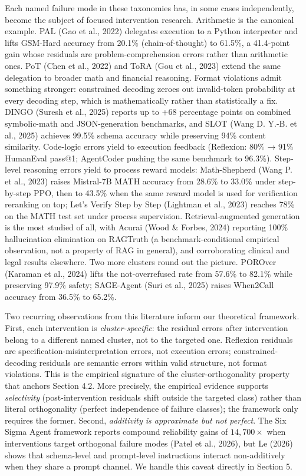 \documentclass[
]{article}
\begin{document}
Each named failure mode in these taxonomies has, in some cases
independently, become the subject of focused intervention research.
Arithmetic is the canonical example. PAL (Gao et al., 2022) delegates
execution to a Python interpreter and lifts GSM-Hard accuracy from
20.1\% (chain-of-thought) to 61.5\%, a 41.4-point gain whose residuals
are problem-comprehension errors rather than arithmetic ones. PoT (Chen
et al., 2022) and ToRA (Gou et al., 2023) extend the same delegation to
broader math and financial reasoning. Format violations admit something
stronger: constrained decoding zeroes out invalid-token probability at
every decoding step, which is mathematically rather than statistically a
fix. DINGO (Suresh et al., 2025) reports up to +68 percentage points on
combined symbolic-math and JSON-generation benchmarks, and SLOT (Wang D.
Y.-B. et al., 2025) achieves 99.5\% schema accuracy while preserving
94\% content similarity. Code-logic errors yield to execution feedback
(Reflexion: 80\% → 91\% HumanEval pass@1; AgentCoder pushing the same
benchmark to 96.3\%). Step-level reasoning errors yield to process
reward models: Math-Shepherd (Wang P. et al., 2023) raises Mistral-7B
MATH accuracy from 28.6\% to 33.0\% under step-by-step PPO, then to
43.5\% when the same reward model is used for verification reranking on
top; Let's Verify Step by Step (Lightman et al., 2023) reaches 78\% on
the MATH test set under process supervision. Retrieval-augmented
generation is the most studied of all, with Acurai (Wood \& Forbes,
2024) reporting 100\% hallucination elimination on RAGTruth (a
benchmark-conditional empirical observation, not a property of RAG in
general), and corroborating clinical and legal results elsewhere. Two
more clusters round out the picture. POROver (Karaman et al., 2024)
lifts the not-overrefused rate from 57.6\% to 82.1\% while preserving
97.9\% safety; SAGE-Agent (Suri et al., 2025) raises When2Call accuracy
from 36.5\% to 65.2\%.

Two recurring observations from this literature inform our theoretical
framework. First, each intervention is \emph{cluster-specific}: the
residual errors after intervention belong to a different named cluster,
not to the targeted one. Reflexion residuals are
specification-misinterpretation errors, not execution errors;
constrained-decoding residuals are semantic errors within valid
structure, not format violations. This is the empirical signature of the
cluster-orthogonality property that anchors Section 4.2. More precisely,
the empirical evidence supports \emph{selectivity} (post-intervention
residuals shift outside the targeted class) rather than literal
orthogonality (perfect independence of failure classes); the framework
only requires the former. Second, \emph{additivity is approximate but
not perfect}. The Six Sigma Agent framework reports compound reliability
gains of \(14{,}700\times\) when interventions target orthogonal failure
modes (Patel et al., 2026), but Le (2026) shows that schema-level and
prompt-level instructions interact non-additively when they share a
prompt channel. We handle this caveat directly in Section 5.
\end{document}

